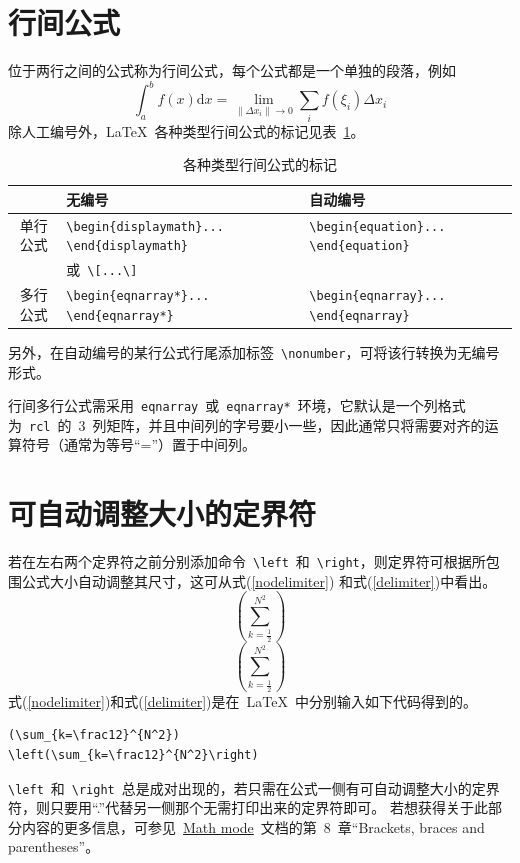 \section{行间公式}
位于两行之间的公式称为行间公式，每个公式都是一个单独的段落，例如
\[\int_a^b{f\left(x\right)\mathrm{d}x}=\lim_{\left\|\Delta{x_i}\right\|\to 0}\sum_i{f\left(\xi_i\right)\Delta{x_i}}\]
除人工编号外，\LaTeX~各种类型行间公式的标记见表~\ref{tab:eqtag}。
\begin{table}[htbp]
\caption{各种类型行间公式的标记}\label{tab:eqtag}
\vspace{0.5em}\centering\wuhao
\begin{tabularx}{\textwidth}{cll}
\toprule
& 无编号 & 自动编号\\
\midrule
单行公式& \verb|\begin{displaymath}... \end{displaymath}|& \verb|\begin{equation}... \end{equation}|\\
        & 或~\verb|\[...\]| & \\
多行公式& \verb|\begin{eqnarray*}... \end{eqnarray*}|& \verb|\begin{eqnarray}... \end{eqnarray}|\\
\bottomrule
\end{tabularx}
\end{table}

另外，在自动编号的某行公式行尾添加标签~\verb|\nonumber|，可将该行转换为无编号形式。

行间多行公式需采用~\verb|eqnarray|~或~\verb|eqnarray*|~环境，它默认是一个列格式为~\verb|rcl|~的~3~列矩阵，并且中间列的字号要小一些，因此通常只将需要对齐的运算符号（通常为等号“=”）置于中间列。

\section{可自动调整大小的定界符}

若在左右两个定界符之前分别添加命令~\verb|\left|~和~\verb|\right|，则定界符可根据所包围公式大小自动调整其尺寸，这可从式(\ref{nodelimiter}) 和式(\ref{delimiter})中看出。
\begin{equation}\label{nodelimiter}
(\sum_{k=\frac12}^{N^2})
\end{equation}
\begin{equation}\label{delimiter}
\left(\sum_{k=\frac12}^{N^2}\right)
\end{equation}
式(\ref{nodelimiter})和式(\ref{delimiter})是在~\LaTeX~中分别输入如下代码得到的。
\begin{verbatim}
(\sum_{k=\frac12}^{N^2})
\left(\sum_{k=\frac12}^{N^2}\right)
\end{verbatim}
\verb|\left|~和~\verb|\right|~总是成对出现的，若只需在公式一侧有可自动调整大小的定界符，则只要用“.”代替另一侧那个无需打印出来的定界符即可。
若想获得关于此部分内容的更多信息，可参见~\href{http://tug.ctan.org/cgi-bin/ctanPackageInformation.py?id=voss-mathmode}{Math mode}~文档的第~8~章“Brackets, braces and parentheses”。

